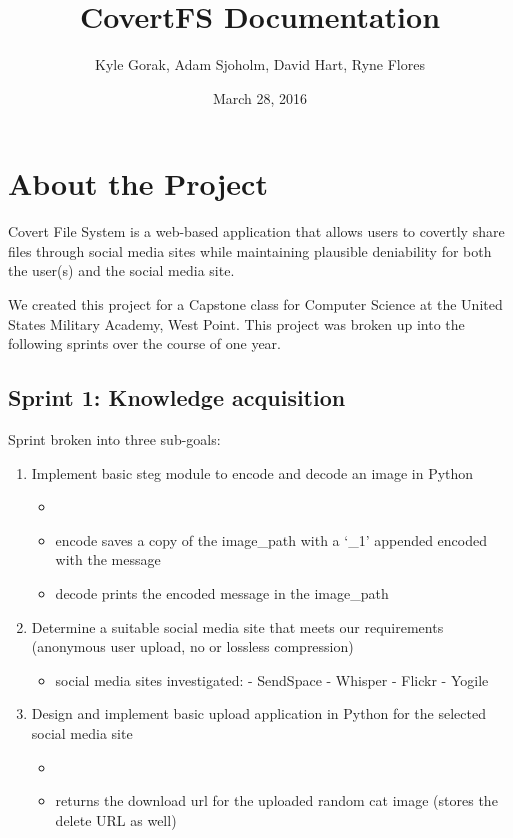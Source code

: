 \documentclass[letterpaper,12pt,openany,oneside]{sphinxmanual}
\title{CovertFS Documentation}
\date{March 28, 2016}
\author{Kyle Gorak, Adam Sjoholm, David Hart, Ryne Flores}
\begin{document}
\maketitle
\tableofcontents
{}\label{index::doc}



\chapter{About the Project}
\label{index:about-the-project}
Covert File System is a web-based application that allows users to covertly share files through social media sites while maintaining plausible deniability for both the user(s) and the social media site.

We created this project for a Capstone class for Computer Science at the United States Military Academy, West Point. This project was broken up into the following sprints over the course of one year.


\section{Sprint 1: Knowledge acquisition}
\label{index:sprint-1-knowledge-acquisition}
Sprint broken into three sub-goals:
\begin{enumerate}
\item {} 
Implement basic steg module to encode and decode an image in Python
\begin{itemize}
\item {} 

\item {} 
encode saves a copy of the image\_path with a `\_1' appended encoded with the message

\item {} 
decode prints the encoded message in the image\_path

\end{itemize}

\item {} 
Determine a suitable social media site that meets our requirements (anonymous user upload, no or lossless compression)
\begin{itemize}
\item {} 
social media sites investigated:
- SendSpace
- Whisper
- Flickr
- Yogile

\end{itemize}

\item {} 
Design and implement basic upload application in Python for the selected social media site
\begin{itemize}
\item {} 

\item {} 
returns the download url for the uploaded random cat image (stores the delete URL as well)

\end{itemize}

\end{enumerate}
\end{document}
